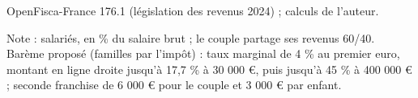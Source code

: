 OpenFisca-France 176.1 (législation des revenus 2024) ; calculs de l'auteur.\par Note : salariés, en \% du salaire brut ; le couple partage ses revenus 60/40. Barème proposé (familles par l'impôt) : taux marginal de 4 \% au premier euro, montant en ligne droite jusqu'à 17,7 \% à 30 000 \euro{}, puis jusqu'à 45 \% à 400 000 \euro{} ; seconde franchise de 6 000 \euro{} pour le couple et 3 000 \euro{} par enfant.
